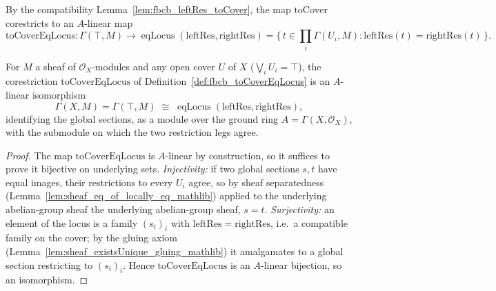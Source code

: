 \begin{definition}
  \label{def:fbcb_toCoverEqLocus}
  By the compatibility Lemma~\ref{lem:fbcb_leftRes_toCover}, the map \(\mathrm{toCover}\) corestricts to
  an \(A\)-linear map
  \[
    \mathrm{toCoverEqLocus} : \Gamma(\top, M)
      \longrightarrow \operatorname{eqLocus}(\mathrm{leftRes}, \mathrm{rightRes})
      = \{\, t \in \textstyle\prod_i \Gamma(U_i,M) : \mathrm{leftRes}(t) = \mathrm{rightRes}(t)\,\}.
  \]
\end{definition}

\begin{lemma}
  \label{lem:fbcb_gammaTopEquivEqLocus}
  For \(M\) a sheaf of \(\mathcal{O}_X\)-modules and any open cover \(U\) of \(X\) (\(\bigvee_i U_i = \top\)), the
  corestriction \(\mathrm{toCoverEqLocus}\) of Definition~\ref{def:fbcb_toCoverEqLocus} is an
  \(A\)-linear isomorphism
  \[
    \Gamma(X, M) = \Gamma(\top, M) \;\cong\; \operatorname{eqLocus}(\mathrm{leftRes}, \mathrm{rightRes}),
  \]
  identifying the global sections, as a module over the ground ring \(A = \Gamma(X,\mathcal{O}_X)\), with
  the submodule on which the two restriction legs agree.
  \begin{proof}
    The map \(\mathrm{toCoverEqLocus}\) is \(A\)-linear by construction, so it suffices to prove it
    bijective on underlying sets. \emph{Injectivity:} if two global sections \(s, t\) have equal images,
    their restrictions to every \(U_i\) agree, so by sheaf separatedness
    (Lemma~\ref{lem:sheaf_eq_of_locally_eq_mathlib}) applied to the underlying abelian-group sheaf
    the underlying abelian-group sheaf, \(s = t\). \emph{Surjectivity:} an element of the locus is a family
    \((s_i)_i\) with \(\mathrm{leftRes} = \mathrm{rightRes}\), i.e.\ a compatible family on the cover; by
    the gluing axiom (Lemma~\ref{lem:sheaf_existsUnique_gluing_mathlib}) it amalgamates to a global
    section restricting to \((s_i)_i\). Hence \(\mathrm{toCoverEqLocus}\) is an \(A\)-linear bijection,
    so an isomorphism.
  \end{proof}
\end{lemma}

